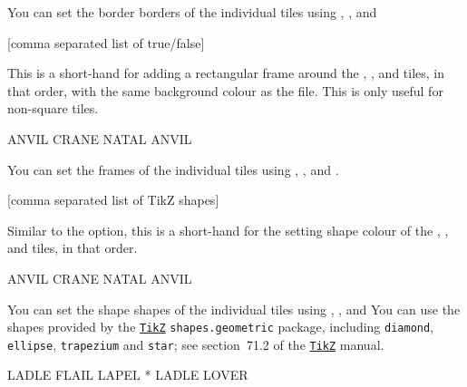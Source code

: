 \documentclass[svgnames]{report}
\newcommand\ctan[1]{\href{https://www.ctan.org/pkg/#1}{\texttt{#1}}}
\begin{document}
  You can set the border borders of the individual tiles using
  , ,  and 

  [comma separated list of true/false]

  This is a short-hand for adding a rectangular frame around the
  , ,  and 
  tiles, in that order, with the same background colour as the
   file. This is only useful for non-square tiles.

  \begin{example}
    \begin{wordle}[frames={false,true,true}, shapes=circle]{ANVIL}
      CRANE
      NATAL
      ANVIL
    \end{wordle}
  \end{example}

  You can set the frames of the individual tiles using
  , ,
   and .

  [comma separated list of TikZ shapes]

  Similar to the  option, this is a short-hand for the
  setting shape colour of the , ,
   and  tiles, in that order.

  \begin{example}
    \begin{wordle}[shapes={circle, rectangle, circle}]{ANVIL}
      CRANE
      NATAL
      ANVIL
    \end{wordle}
  \end{example}

  You can set the shape shapes of the individual tiles using
  , ,
   and 
  You can use the shapes provided by the \ctan{TikZ}
  \texttt{shapes.geometric} package, including \texttt{diamond},
  \texttt{ellipse}, \texttt{trapezium} and \texttt{star}; see
  section~71.2 of the \ctan{TikZ} manual.

  \begin{example}
    \begin{wordle}[shapes={diamond, ellipse, star}]{LADLE}
       FLAIL
       LAPEL
       *
       LADLE
       LOVER
    \end{wordle}
  \end{example}
\end{document}
